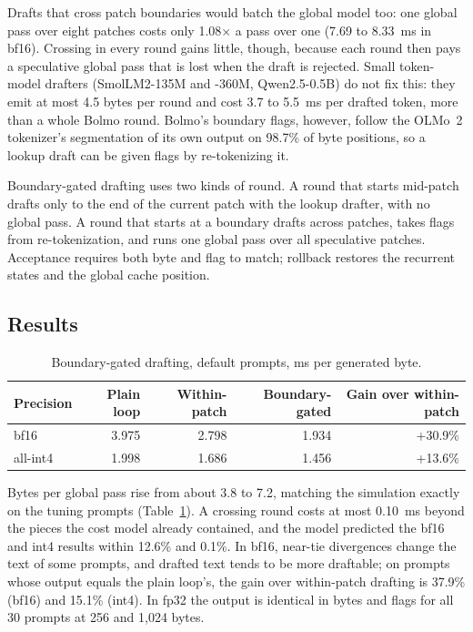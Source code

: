 \documentclass[11pt,a4paper]{article}
\newcommand{\x}{\ensuremath{\times}}
\begin{document}
Drafts that cross patch boundaries would batch the global model too: one global pass over eight patches costs only 1.08\x{} a pass over one (7.69 to 8.33~ms in bf16). Crossing in every round gains little, though, because each round then pays a speculative global pass that is lost when the draft is rejected. Small token-model drafters (SmolLM2-135M and -360M, Qwen2.5-0.5B) do not fix this: they emit at most 4.5 bytes per round and cost 3.7 to 5.5~ms per drafted token, more than a whole Bolmo round. Bolmo's boundary flags, however, follow the OLMo~2 tokenizer's segmentation of its own output on 98.7\% of byte positions, so a lookup draft can be given flags by re-tokenizing it.

Boundary-gated drafting uses two kinds of round. A round that starts mid-patch drafts only to the end of the current patch with the lookup drafter, with no global pass. A round that starts at a boundary drafts across patches, takes flags from re-tokenization, and runs one global pass over all speculative patches. Acceptance requires both byte and flag to match; rollback restores the recurrent states and the global cache position.

\subsection{Results}

\begin{table}[htbp]
\centering
\caption{Boundary-gated drafting, default prompts, ms per generated byte.}
\label{tab:gated}
\begin{tabular}{lrrrr}
\toprule
Precision & Plain loop & Within-patch & Boundary-gated & Gain over within-patch \\
\midrule
bf16 & 3.975 & 2.798 & 1.934 & +30.9\% \\
all-int4 & 1.998 & 1.686 & 1.456 & +13.6\% \\
\bottomrule
\end{tabular}
\end{table}

Bytes per global pass rise from about 3.8 to 7.2, matching the simulation exactly on the tuning prompts (Table~\ref{tab:gated}). A crossing round costs at most 0.10~ms beyond the pieces the cost model already contained, and the model predicted the bf16 and int4 results within 12.6\% and 0.1\%. In bf16, near-tie divergences change the text of some prompts, and drafted text tends to be more draftable; on prompts whose output equals the plain loop's, the gain over within-patch drafting is 37.9\% (bf16) and 15.1\% (int4). In fp32 the output is identical in bytes and flags for all 30 prompts at 256 and 1{,}024 bytes.
\end{document}
